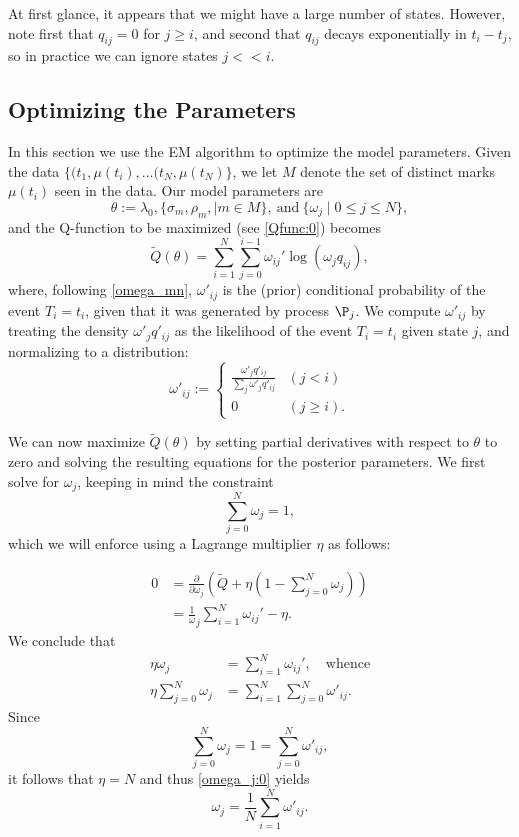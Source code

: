 \documentclass[12pt,leqno]{article}
\begin{document}
At first glance, it appears that we might have a large number of states.  However, note first that $q_{ij} = 0$ for $j \ge i$, and second that $q_{ij}$ decays exponentially in $t_i-t_j$, so in practice we can ignore states $j << i$.


\subsection{Optimizing the Parameters}
In this section we use the EM algorithm to optimize the model parameters.
Given the data $\{(t_1,\mu(t_i),\dots(t_N,\mu(t_N)\}$, we let $M$ denote the set of distinct marks $\mu(t_i)$
seen in the data.  Our model parameters are
$$
\theta := \lambda_0, \{\sigma_m, \rho_m, \mid m \in M\},~\text{and}~ \{\omega_j\mid 0\le j\le N\},
$$
and the Q-function to be maximized (see \eqref{Qfunc:0}) becomes
\begin{equation}\label{Q}
\tilde{Q}(\theta) = \sum_{i=1}^N\sum_{j=0}^{i-1}\omega_{ij}'\log(\omega_jq_{ij}),
\end{equation}
where, following \eqref{omega_mn}, $\omega'_{ij}$ is the (prior) conditional
probability of the event $T_i=t_i$,
given that it was generated by process $\P_j$.  We compute $\omega'_{ij}$ by
treating the density $\omega'_jq'_{ij}$ as the likelihood of the event $T_i = t_i$ given state $j$,
and normalizing to a distribution:
\begin{equation}\label{omega'_ij}
\omega'_{ij} :=
\begin{cases}
  \frac{\omega'_jq'_{ij}}{\sum_j\omega'_jq'_{ij}}&(j < i) \\
  0&(j \ge i).
\end{cases}
\end{equation}


We can now maximize $\tilde{Q}(\theta)$ by setting partial derivatives with respect to $\theta$ to
zero and solving the resulting equations for the posterior parameters.  We first solve for $\omega_j$, keeping in
mind the constraint
$$
\sum_{j=0}^N\omega_j = 1,
$$
which we will enforce using a Lagrange multiplier $\eta$ as follows:

\begin{align*}
  0 &= \frac{\partial}{\partial\omega_j}\left(\tilde{Q} + \eta(1-\sum_{j=0}^N\omega_j )\right) \\
  &= \frac{1}\omega_j\sum_{i=1}^N\omega_{ij}' - \eta.
\end{align*}
We conclude that
\begin{equation}\label{omega_j:0}
  \begin{split}
  \eta\omega_j &= \sum_{i=1}^N\omega_{ij}',\quad\text{whence} \\
  \eta\sum_{j=0}^N\omega_j &= \sum_{i=1}^N\sum_{j=0}^N\omega'_{ij}.
  \end{split}
\end{equation}
Since
$$
\sum_{j=0}^N \omega_j = 1 = \sum_{j=0}^N\omega'_{ij},
$$
it follows that $\eta = N$ and thus \eqref{omega_j:0} yields
\begin{equation}\label{omega_j}
  \omega_j = \frac{1}{N}\sum_{i=1}^N\omega'_{ij}.
\end{equation}
\end{document}
